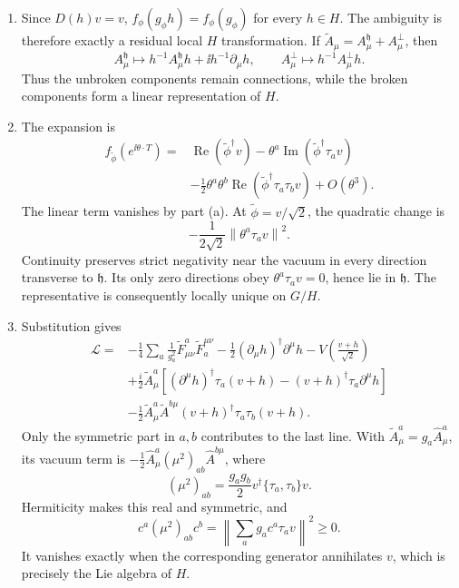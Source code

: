 \begin{enumerate}
\begin{enumerate}
    \item Since \(D(h)v=v\),
      \(f_\phi(g_\phi h)=f_\phi(g_\phi)\) for every \(h\in H\).  The
      ambiguity is therefore exactly a residual local \(H\) transformation.
      If \(\widetilde A_\mu=A_\mu^{\mathfrak h}+A_\mu^\perp\), then
      \[
        A_\mu^{\mathfrak h}\longmapsto
          h^{-1}A_\mu^{\mathfrak h}h+\ii h^{-1}\partial_\mu h,
        \qquad
        A_\mu^\perp\longmapsto h^{-1}A_\mu^\perp h.
      \]
      Thus the unbroken components remain connections, while the broken
      components form a linear representation of \(H\).

    \item The expansion is
      \[
      \begin{split}
        f_{\widetilde\phi}(e^{\ii\theta\cdot T})
          ={}&\operatorname{Re}(\widetilde\phi^\dagger v)
          -\theta^a\operatorname{Im}
             (\widetilde\phi^\dagger\tau_av)\\
          &-\frac12\theta^a\theta^b
             \operatorname{Re}
             (\widetilde\phi^\dagger\tau_a\tau_bv)+O(\theta^3).
      \end{split}
      \]
      The linear term vanishes by part (a).  At
      \(\widetilde\phi=v/\sqrt2\), the quadratic change is
      \[
        -\frac1{2\sqrt2}\left\|\theta^a\tau_av\right\|^2.
      \]
      Continuity preserves strict negativity near the vacuum in every
      direction transverse to \(\mathfrak h\).  Its only zero directions
      obey \(\theta^a\tau_av=0\), hence lie in \(\mathfrak h\).  The
      representative is consequently locally unique on \(G/H\).

    \item Substitution gives
      \[
      \begin{split}
        \mathcal L={}&-\frac14\sum_a\frac1{g_a^2}
          \widetilde F^a_{\mu\nu}\widetilde F_a^{\mu\nu}
          -\frac12(\partial_\mu h)^\dagger\partial^\mu h
          -V\!\left(\frac{v+h}{\sqrt2}\right)\\
        &+\frac i2\widetilde A^a_\mu
          \left[(\partial^\mu h)^\dagger\tau_a(v+h)
               -(v+h)^\dagger\tau_a\partial^\mu h\right]\\
        &-\frac12\widetilde A^a_\mu\widetilde A^{b\mu}
             (v+h)^\dagger\tau_a\tau_b(v+h).
      \end{split}
      \]
      Only the symmetric part in \(a,b\) contributes to the last line.
      With \(\widetilde A^a_\mu=g_a\widehat A^a_\mu\), its vacuum term is
      \(-\tfrac12\widehat A^a_\mu(\mu^2)_{ab}\widehat A^{b\mu}\), where
      \[
        (\mu^2)_{ab}=\frac{g_ag_b}{2}
        v^\dagger\{\tau_a,\tau_b\}v.
      \]
      Hermiticity makes this real and symmetric, and
      \[
        c^a(\mu^2)_{ab}c^b
          =\left\|\sum_a g_ac^a\tau_av\right\|^2\geq0.
      \]
      It vanishes exactly when the corresponding generator annihilates
      \(v\), which is precisely the Lie algebra of \(H\).


\end{enumerate}
\end{enumerate}
